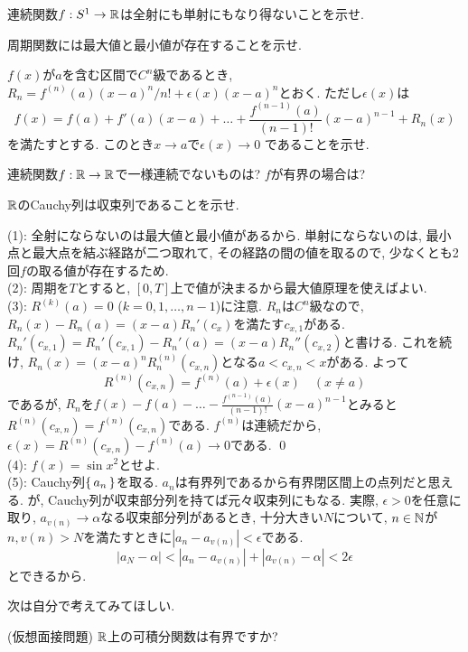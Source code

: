 \begin{egprob}
\ben
\item 連続関数$f:S^1 \to \mathbb{R}$は全射にも単射にもなり得ないことを示せ.
\item 周期関数には最大値と最小値が存在することを示せ.
\item $f(x)$が$a$を含む区間で$C^n$級であるとき, $R_n = f^{(n)}(a)(x-a)^n/n! + \epsilon(x) (x-a)^n$とおく. ただし$\epsilon(x)$は
\[f(x) = f(a) + f'(a)(x-a) + \dots + \dfrac{f^{(n-1)}(a)}{(n-1)!}(x-a)^{n-1} + R_n(x)\]
を満たすとする. このとき$x\to a $で$\epsilon(x) \to 0$ であることを示せ.
\item 連続関数$f:\mathbb{R}\to \mathbb{R}$で一様連続でないものは? $f$が有界の場合は?
\item $\mathbb{R}$のCauchy列は収束列であることを示せ.
\een
\end{egprob}
\begin{egans}
(1): 全射にならないのは最大値と最小値があるから. 単射にならないのは, 最小点と最大点を結ぶ経路が二つ取れて, その経路の間の値を取るので, 少なくとも2回$f$の取る値が存在するため. \\
(2): 周期を$T$とすると, $[0,T]$上で値が決まるから最大値原理を使えばよい.  \\
(3): $R^{(k)}(a) = 0$ ($k=0,1,\dots, n-1$)に注意.
$R_n$は$C^n$級なので, $R_n(x) - R_n(a) = (x-a)R_n'(c_x)$を満たす$c_{x,1}$がある.
$R_n'(c_{x,1})=R_n'(c_{x,1}) - R_n'(a) = (x-a)R_n''(c_{x,2})$と書ける. これを続け, $R_n(x) = (x-a)^n R_n^{(n)}(c_{x,n})$となる$a<c_{x,n}<x$がある.
よって
\[R^{(n)}(c_{x,n}) = f^{(n)}(a) + \epsilon(x) \quad (x\neq a)\]
であるが, $R_n$を$f(x) - f(a) - \dots - \frac{f^{(n-1)}(a)}{(n-1)!}(x-a)^{n-1}$とみると $R^{(n)}(c_{x,n}) = f^{(n)}(c_{x,n})$である. $f^{(n)}$は連続だから, $\epsilon(x) = R^{(n)}(c_{x,n}) - f^{(n)}(a)\to 0$である. \qed
\\
(4): $f(x) = \sin{x^2}$とせよ. \\
(5): Cauchy列$\set{a_n}$を取る. $a_n$は有界列であるから有界閉区間上の点列だと思える. が, Cauchy列が収束部分列を持てば元々収束列にもなる. 実際, $\epsilon > 0$を任意に取り, $a_{v(n)}\to \alpha$なる収束部分列があるとき, 十分大きい$N$について, $n\in \mathbb{N}$が$n,v(n) > N$を満たすときに$|a_{n} - a_{v(n)}| < \epsilon$である.
\[|a_N - \alpha| < |a_n - a_{v(n)}| + |a_{v(n)} - \alpha| < 2\epsilon \]
とできるから.
\end{egans}


次は自分で考えてみてほしい.
\begin{prac} (仮想面接問題)
$\mathbb{R}$上の可積分関数は有界ですか?
\end{prac}

